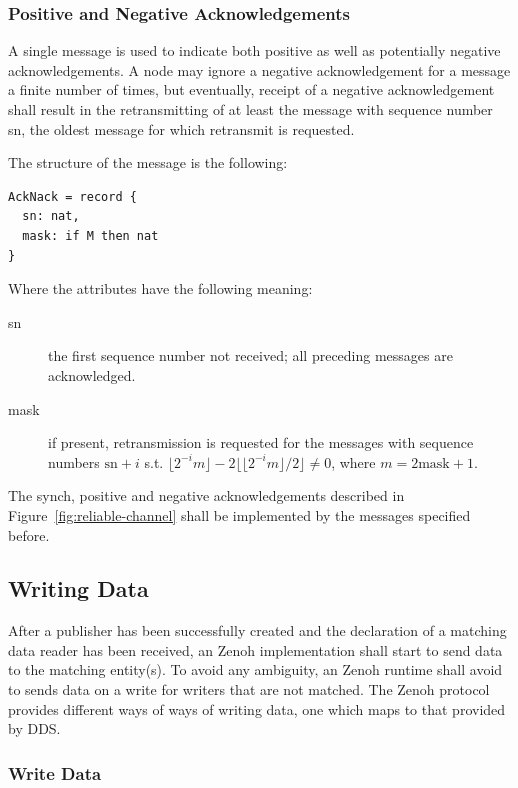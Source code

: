 \documentclass[a4paper,oneside,article]{memoir}
\begin{document}
\subsubsection{Positive and Negative Acknowledgements}

A single message is used to indicate both positive as well as potentially negative acknowledgements.
A node may ignore a negative acknowledgement for a message a finite number of times, but eventually,
receipt of a negative acknowledgement shall result in the retransmitting of at least the message
with sequence number sn, the oldest message for which retransmit is requested.

The structure of the message is the following:
\begin{verbatim}
AckNack = record {
  sn: nat,
  mask: if M then nat
}
\end{verbatim}
Where the attributes have the following meaning:
\begin{description}
\item[sn] the first sequence number not received; all preceding messages are acknowledged.
\item[mask] if present, retransmission is requested for the messages
  with sequence numbers $\mathrm{sn}+i$ s.t.
  $\lfloor 2^{-i} m \rfloor - 2 \big\lfloor \lfloor 2^{-i} m \rfloor /
  2 \big\rfloor \neq 0$, where $m = 2 \mathrm{mask} + 1$.
\end{description}

The synch, positive and negative acknowledgements described in Figure~\ref{fig:reliable-channel}
shall be implemented by the messages specified before.

\subsection{Writing Data}

After a publisher has been successfully created and the declaration of a matching data reader has
been received, an Zenoh implementation shall start to send data to the matching entity(s).  To avoid
any ambiguity, an Zenoh runtime shall avoid to sends data on a write for writers that are not
matched.  The Zenoh protocol provides different ways of ways of writing data, one which maps to that
provided by DDS\@.

\subsubsection{Write Data}
\end{document}
